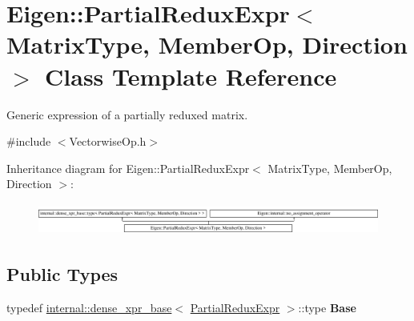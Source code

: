 \hypertarget{class_eigen_1_1_partial_redux_expr}{}\section{Eigen\+::Partial\+Redux\+Expr$<$ Matrix\+Type, Member\+Op, Direction $>$ Class Template Reference}
\label{class_eigen_1_1_partial_redux_expr}


Generic expression of a partially reduxed matrix.  




{\ttfamily \#include $<$Vectorwise\+Op.\+h$>$}

Inheritance diagram for Eigen\+::Partial\+Redux\+Expr$<$ Matrix\+Type, Member\+Op, Direction $>$\+:\begin{figure}[H]
\begin{center}
\leavevmode
\includegraphics[height=1.054614cm]{class_eigen_1_1_partial_redux_expr}
\end{center}
\end{figure}
\subsection*{Public Types}
\begin{DoxyCompactItemize}
\item 
\mbox{\label{class_eigen_1_1_partial_redux_expr_a54b5729b220e26fd72c27578a8528f17}} 
typedef \mbox{\hyperlink{struct_eigen_1_1internal_1_1dense__xpr__base}{internal\+::dense\+\_\+xpr\+\_\+base}}$<$ \mbox{\hyperlink{class_eigen_1_1_partial_redux_expr}{Partial\+Redux\+Expr}} $>$\+::type {\bfseries Base}
\end{DoxyCompactItemize}
